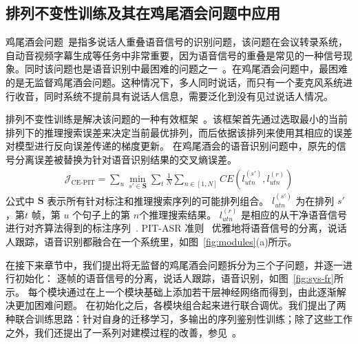 \subsection{排列不变性训练及其在鸡尾酒会问题中应用}
\label{chap:intro2-pit-pit}

鸡尾酒会问题~\cite{cherry1953some,bregman1994auditory}是指多说话人重叠语音信号的识别问题，该问题在会议转录系统，自动音视频字幕生成等任务中非常重要，因为语音信号的重叠是常见的一种信号现象。同时该问题也是语音识别中最困难的问题之一~\cite{wang2006computational,cooke2010monaural,du2014speech,weng2015deep}。在鸡尾酒会问题中，最困难的是无监督鸡尾酒会问题。这种情况下，多人同时说话，而只有一个麦克风系统进行收音，同时系统不提前具有说话人信息，需要泛化到没有见过说话人情况。


排列不变性训练是解决该问题的一种有效框架~\cite{yu2017recognizing}。该框架首先通过选取最小的当前排列下的推理搜索误差来决定当前最优排列，而后依据该排列来使用其相应的误差对模型进行反向误差传递的梯度更新。
在鸡尾酒会的语音识别问题中，原先的信号分离误差被替换为针对语音识别结果的交叉熵误差。
\begin{equation}
\label{equ:ce-pit}
\begin{split}
\mathcal{J}_{\text{CE-PIT}}=\sum_u \min_{s'\in \mathbf{S}} \sum_t \frac{1}{N} \sum_{n\in[1,N]} CE({l}_{utn}^{(s')},{l}_{utn}^{(r)})
\end{split}
\end{equation}
公式中 $\mathbf{S}$ 表示所有针对标注和推理搜索序列的可能排列组合。
${l}_{utn}^{(s')}$ 为在排列 $s'$ ，第$t$ 帧，第 $u$ 个句子上的第 $n$个推理搜索结果。 ${l}_{utn}^{(r)}$ 是相应的从干净语音信号进行对齐算法得到的标注序列~\cite{woodland1994large}.
PIT-ASR 准则~\cite{yu2017recognizing} 优雅地将语音信号的分离，说话人跟踪，语音识别都融合在一个系统里，如图~\ref{fig:modules}(a)所示。

在接下来章节中，我们提出将无监督的鸡尾酒会问题拆分为三个子问题，并逐一进行初始化：
逐帧的语音信号的分离，说话人跟踪，语音识别，如图~\ref{fig:sys-fr}所示。 
每个模块通过在上一个模块基础上添加若干层神经网络而得到，由此逐渐解决更加困难问题。
在初始化之后，各模块组合起来进行联合调优。我们提出了两种联合训练思路：针对自身的迁移学习，多输出的序列鉴别性训练；除了这些工作之外，我们还提出了一系列对建模过程的改善，参见~\cite{chen2018progressive}。


